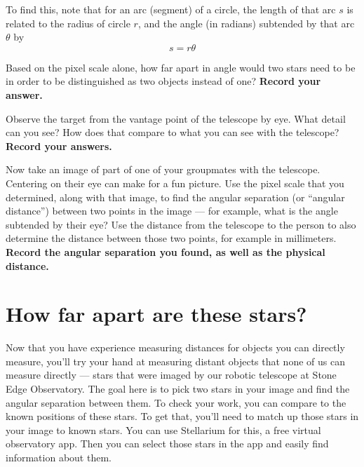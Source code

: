\begin{steps}
	To find this, note that for an arc (segment) of a circle, the length of that arc $s$ is related to the radius of circle $r$, and the angle (in radians) subtended by that arc $\theta$ by
	\begin{equation}
	s = r \theta
	\end{equation}

	\item Based on the pixel scale alone, how far apart in angle would two stars need to be in order to be distinguished as two objects instead of one? \textbf{Record your answer.}
	
	\item Observe the target from the vantage
	point of the telescope by eye. What detail can you see? How does that compare to what
	you can see with the telescope? \textbf{Record your answers.}
	
	\item Now take an image of part of one of your groupmates with the telescope. Centering on their eye can make for a fun picture. Use the pixel scale that you determined, along with that image, to find the angular separation (or ``angular distance'') between two points in the image --- for example, what is the angle subtended by their eye? Use the distance from the telescope to the person to also determine the distance between those two points, for example in millimeters. \textbf{Record the angular separation you found, as well as the physical distance.} %
\end{steps}

\section{How far apart are these stars?}

Now that you have experience measuring distances for objects you can directly measure, you'll try your hand at measuring distant objects that none of us can measure directly --- stars that were imaged by our robotic telescope at Stone Edge Observatory.
The goal here is to pick two stars in your image and find the angular separation between them.
To check your work, you can compare to the known positions of these stars. To get that, you'll need to match up those stars in your image to known stars. You can use Stellarium for this, a free virtual observatory app. Then you can select those stars in the app and easily find information about them.

